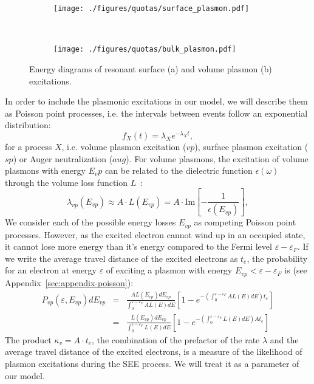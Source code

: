 \begin{refsection}
\begin{figure}[h]
    \centering
    \begin{subfigure}[t]{0.4\textwidth}
        \centering
        \texttt{[image: ./figures/quotas/surface\_plasmon.pdf]}
        \caption{}
    \end{subfigure}%
    ~ 
    \begin{subfigure}[t]{0.4\textwidth}
        \centering
        \texttt{[image: ./figures/quotas/bulk\_plasmon.pdf]}
        \caption{}
    \end{subfigure}
\caption{Energy diagrams of resonant surface (a) and volume plasmon (b) excitations.}
\label{quotas:fig-plasmons}
\end{figure}

In order to include the plasmonic excitations in our model, we will describe them as Poisson point processes, i.e. the intervals between events follow an exponential distribution:
\begin{equation}
f_X (t) = \lambda_X e^{-\lambda_X t},
\end{equation}
for a process $X$, i.e. volume plasmon excitation ($vp$), surface plasmon excitation ($sp$) or Auger neutralization ($aug$). For volume plasmons, the excitation of volume plasmons with energy $E_vp$ can be related to the dielectric function $\epsilon (\omega)$ through the volume loss function $L$~\cite{Raether1980}:
\begin{equation}
\lambda_{vp}(E_{vp}) \approx A \cdot L(E_{vp}) = A \cdot \text{Im}\left[-\frac{1}{\epsilon(E_{vp})}\right],
\end{equation}
We consider each of the possible energy losses $E_{vp}$ as competing Poisson point processes. However, as the excited electron cannot wind up in an occupied state, it cannot lose more energy than it's energy compared to the Fermi level $\varepsilon - \varepsilon_F$. If we write the average travel distance of the excited electrons as $t_e$, the probability for an electron at energy $\varepsilon$ of exciting a plasmon with energy $E_{vp} < \varepsilon - \varepsilon_F$ is (see Appendix~\ref{sec:appendix-poisson}):
\begin{eqnarray}
P_{vp}(\varepsilon, E_{vp}) dE_{vp} &=& \frac{A L(E_{vp})dE_{vp}}{\int_0^{\varepsilon - \varepsilon_F} A L(E) dE }\left[1-e^{-\left(\int_0^{\varepsilon - \varepsilon_F} A L(E) dE\right) t_e }\right] \\
&=& \frac{L(E_{vp})dE_{vp}}{\int_0^{\varepsilon - \varepsilon_F} L(E) dE }\left[1-e^{-\left(\int_0^{\varepsilon - \varepsilon_F} L(E) dE\right) A t_e }\right]
\end{eqnarray}
The product $\kappa_v = A \cdot t_e$, the combination of the prefactor of the rate $\lambda$ and the average travel distance of the excited electrons, is a measure of the likelihood of plasmon excitations during the SEE process. We will treat it as a parameter of our model. 


\end{refsection}
